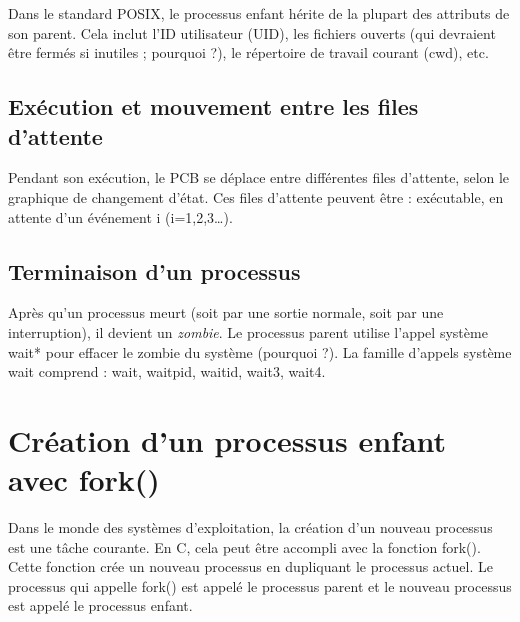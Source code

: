 \documentclass[12pt]{report}
\begin{document}
Dans le standard POSIX, le processus enfant hérite de la plupart des attributs de son parent. Cela inclut l'ID utilisateur (UID), les fichiers ouverts (qui devraient être fermés si inutiles ; pourquoi ?), le répertoire de travail courant (cwd), etc.

\subsection{Exécution et mouvement entre les files d'attente}

Pendant son exécution, le PCB se déplace entre différentes files d'attente, selon le graphique de changement d'état. Ces files d'attente peuvent être : exécutable, en attente d'un événement i (i=1,2,3…).

\subsection{Terminaison d'un processus}

Après qu'un processus meurt (soit par une sortie normale, soit par une interruption), il devient un \textit{zombie}. Le processus parent utilise l'appel système wait* pour effacer le zombie du système (pourquoi ?). La famille d'appels système wait comprend : wait, waitpid, waitid, wait3, wait4.

\section{Création d'un processus enfant avec fork()}

Dans le monde des systèmes d'exploitation, la création d'un nouveau processus est une tâche courante. En C, cela peut être accompli avec la fonction fork(). Cette fonction crée un nouveau processus en dupliquant le processus actuel. Le processus qui appelle fork() est appelé le processus parent et le nouveau processus est appelé le processus enfant.
\end{document}
